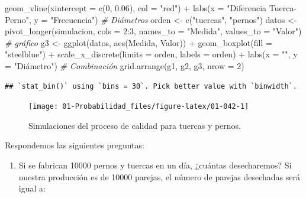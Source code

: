 \documentclass[
]{book}
\newenvironment{Shaded}{\begin{snugshade}}{\end{snugshade}}
\newcommand{\AttributeTok}[1]{\textcolor[rgb]{0.77,0.63,0.00}{#1}}
\newcommand{\CommentTok}[1]{\textcolor[rgb]{0.56,0.35,0.01}{\textit{#1}}}
\newcommand{\DecValTok}[1]{\textcolor[rgb]{0.00,0.00,0.81}{#1}}
\newcommand{\FloatTok}[1]{\textcolor[rgb]{0.00,0.00,0.81}{#1}}
\newcommand{\FunctionTok}[1]{\textcolor[rgb]{0.00,0.00,0.00}{#1}}
\newcommand{\NormalTok}[1]{#1}
\newcommand{\OtherTok}[1]{\textcolor[rgb]{0.56,0.35,0.01}{#1}}
\newcommand{\SpecialCharTok}[1]{\textcolor[rgb]{0.00,0.00,0.00}{#1}}
\newcommand{\StringTok}[1]{\textcolor[rgb]{0.31,0.60,0.02}{#1}}
\providecommand{\tightlist}{%
  \setlength{\itemsep}{0pt}\setlength{\parskip}{0pt}}
\theoremstyle{definition}
\theoremstyle{definition}
\theoremstyle{definition}
\theoremstyle{definition}
\theoremstyle{remark}
\begin{document}
\begin{Shaded}
\begin{Highlighting}[]
  \FunctionTok{geom\_vline}\NormalTok{(}\AttributeTok{xintercept =} \FunctionTok{c}\NormalTok{(}\DecValTok{0}\NormalTok{, }\FloatTok{0.06}\NormalTok{), }\AttributeTok{col =} \StringTok{"red"}\NormalTok{) }\SpecialCharTok{+}
  \FunctionTok{labs}\NormalTok{(}\AttributeTok{x =} \StringTok{"Diferencia Tuerca{-}Perno"}\NormalTok{, }\AttributeTok{y =} \StringTok{"Frecuencia"}\NormalTok{)}
\CommentTok{\# Diámetros}
\NormalTok{orden }\OtherTok{\textless{}{-}} \FunctionTok{c}\NormalTok{(}\StringTok{"tuercas"}\NormalTok{, }\StringTok{"pernos"}\NormalTok{)}
\NormalTok{datos }\OtherTok{\textless{}{-}} \FunctionTok{pivot\_longer}\NormalTok{(simulacion, }\AttributeTok{cols =} \DecValTok{2}\SpecialCharTok{:}\DecValTok{3}\NormalTok{, }\AttributeTok{names\_to =} \StringTok{"Medida"}\NormalTok{, }\AttributeTok{values\_to =} \StringTok{"Valor"}\NormalTok{)}
\CommentTok{\# gráfico}
\NormalTok{g3 }\OtherTok{\textless{}{-}} \FunctionTok{ggplot}\NormalTok{(datos, }\FunctionTok{aes}\NormalTok{(Medida, Valor)) }\SpecialCharTok{+} 
  \FunctionTok{geom\_boxplot}\NormalTok{(}\AttributeTok{fill =} \StringTok{"steelblue"}\NormalTok{) }\SpecialCharTok{+}
  \FunctionTok{scale\_x\_discrete}\NormalTok{(}\AttributeTok{limits =}\NormalTok{ orden, }\AttributeTok{labels =}\NormalTok{ orden) }\SpecialCharTok{+}
  \FunctionTok{labs}\NormalTok{(}\AttributeTok{x =} \StringTok{""}\NormalTok{, }\AttributeTok{y =} \StringTok{"Diámetro"}\NormalTok{)}
\CommentTok{\# Combinación}
\FunctionTok{grid.arrange}\NormalTok{(g1, g2, g3, }\AttributeTok{nrow =} \DecValTok{2}\NormalTok{)}
\end{Highlighting}
\end{Shaded}

\begin{verbatim}
## `stat_bin()` using `bins = 30`. Pick better value with `binwidth`.
\end{verbatim}

\begin{figure}

{\centering \texttt{[image: 01-Probabilidad\_files/figure-latex/01-042-1]} 

}

\caption{Simulaciones del proceso de calidad para tuercas y pernos.}\label{fig:01-042}
\end{figure}

Respondemos las siguientes preguntas:

\begin{enumerate}
\def\labelenumi{\arabic{enumi}.}
\setcounter{enumi}{1}
\tightlist
\item
  Si se fabrican 10000 pernos y tuercas en un día, ¿cuántas desecharemos? Si nuestra producción es de 10000 parejas, el número de parejas desechadas será igual a:
\end{enumerate}
\end{document}
